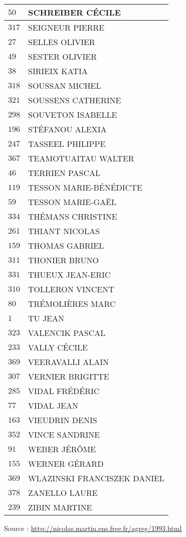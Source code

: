 \begin{xltabular}{\linewidth}{|l|X|}
    \hline
    $50$ & SCHREIBER CÉCILE \\
    \hline
    $317$ & SEIGNEUR PIERRE \\
    \hline
    $27$ & SELLES OLIVIER \\
    \hline
    $49$ & SESTER OLIVIER \\
    \hline
    $38$ & SIRIEIX KATIA \\
    \hline
    $318$ & SOUSSAN MICHEL \\
    \hline
    $321$ & SOUSSENS CATHERINE \\
    \hline
    $298$ & SOUVETON ISABELLE \\
    \hline
    $196$ & STÉFANOU ALEXIA \\
    \hline
    $247$ & TASSEEL PHILIPPE \\
    \hline
    $367$ & TEAMOTUAITAU WALTER \\
    \hline
    $46$ & TERRIEN PASCAL \\
    \hline
    $119$ & TESSON MARIE-BÉNÉDICTE \\
    \hline
    $59$ & TESSON MARIE-GAËL \\
    \hline
    $334$ & THÉMANS CHRISTINE \\
    \hline
    $261$ & THIANT NICOLAS \\
    \hline
    $159$ & THOMAS GABRIEL \\
    \hline
    $311$ & THONIER BRUNO \\
    \hline
    $331$ & THUEUX JEAN-ERIC \\
    \hline
    $310$ & TOLLERON VINCENT \\
    \hline
    $80$ & TRÉMOLIÈRES MARC \\
    \hline
    $1$ & TU JEAN \\
    \hline
    $323$ & VALENCIK PASCAL \\
    \hline
    $233$ & VALLY CÉCILE \\
    \hline
    $369$ & VEERAVALLI ALAIN \\
    \hline
    $307$ & VERNIER BRIGITTE \\
    \hline
    $285$ & VIDAL FRÉDÉRIC \\
    \hline
    $77$ & VIDAL JEAN \\
    \hline
    $163$ & VIEUDRIN DENIS \\
    \hline
    $352$ & VINCE SANDRINE \\
    \hline
    $91$ & WEBER JÉRÔME \\
    \hline
    $155$ & WERNER GÉRARD \\
    \hline
    $369$ & WLAZINSKI FRANCISZEK DANIEL \\
    \hline
    $378$ & ZANELLO LAURE \\
    \hline
    $239$ & ZIBIN MARTINE \\
    \hline
  \end{xltabular}

  \begin{flushright}
    {\tiny Source : \url{http://nicolas.martin.ens.free.fr/agreg/1993.html}}
  \end{flushright}

